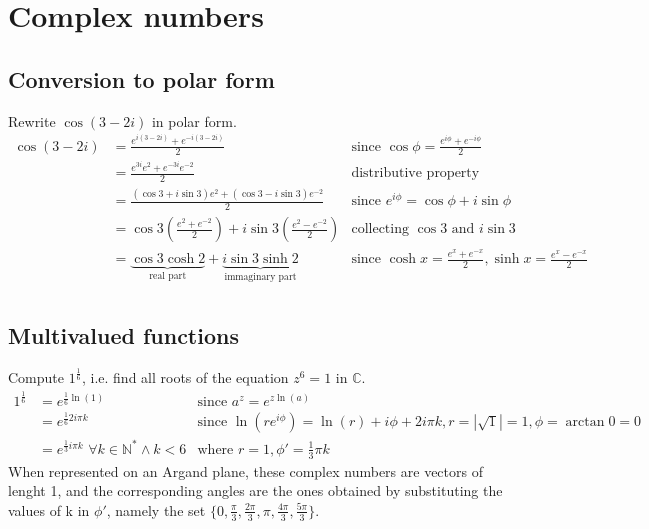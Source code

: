 \section{Complex numbers}

  \subsection{Conversion to polar form}
  Rewrite $\cos(3-2i)$ in polar form.
  \begin{align*}
    \cos(3-2i) & = \frac{e^{i(3-2i)} + e^{-i(3-2i)}}{2}
               & \text{since }\cos\phi = \frac{e^{i\phi} + e^{-i\phi}}{2} \\
               & = \frac{e^{3i}e^{2} + e^{-3i}e^{-2}}{2}
               & \text{distributive property} \\
               & = \frac{(\cos3 + i\sin3)e^{2} + (\cos3 - i\sin3)e^{-2}}{2}
               & \text{since } e^{i\phi} = \cos\phi + i\sin\phi \\
               & = \cos3\left(\frac{e^2+e^{-2}}{2}\right) + i\sin3\left(\frac{e^2-e^{-2}}{2}\right)
               & \text{collecting } \cos3 \text{ and } i\sin3 \\
               & = \underbrace{\cos3\cosh2}_{\text{real part}} + \underbrace{i\sin3\sinh2}_{\text{immaginary part}}
               & \text{since } \cosh x = \frac{e^x+e^{-x}}{2}, \sinh x = \frac{e^x-e^{-x}}{2} \\
  \end{align*}

  \subsection{Multivalued functions}
  Compute $1^{\frac{1}{6}}$, i.e. find all roots of the equation $z^{6} = 1$ in $\mathbb{C}$.
  \begin{align*}
    1^{\frac{1}{6}} & = e^{\frac{1}{6}\ln(1)}
                    & \text{since } a^z = e^{z\ln(a)}\\
                    & = e^{\frac{1}{6}2i\pi k}
                    & \text{since } \ln(re^{i\phi}) = \ln(r) + i\phi + 2i\pi k, 
                                    r = |\sqrt1| = 1, 
                                    \phi = \arctan{0} = 0\\
                    & = e^{\frac{1}{3}i\pi k} \,\,\forall k \in \mathbb{N}^* \wedge k < 6
                    & \text{where } r = 1, \phi' = \frac{1}{3} \pi k
  \end{align*}
  When represented on an Argand plane, these complex numbers are vectors of lenght 1, and the corresponding angles are the ones obtained by substituting the values of k in $\phi'$, namely the set $\{0, \frac{\pi}{3}, \frac{2\pi}{3}, \pi, \frac{4\pi}{3}, \frac{5\pi}{3}\}$.

